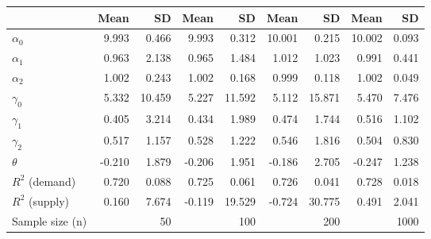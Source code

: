 
\begin{tabular}[t]{lrrrrrrrr}
\toprule
  & Mean & SD & Mean  & SD  & Mean   & SD   & Mean    & SD   \\
\midrule
$\alpha_{0}$ & 9.993 & 0.466 & 9.993 & 0.312 & 10.001 & 0.215 & 10.002 & 0.093\\
$\alpha_{1}$ & 0.963 & 2.138 & 0.965 & 1.484 & 1.012 & 1.023 & 0.991 & 0.441\\
$\alpha_{2}$ & 1.002 & 0.243 & 1.002 & 0.168 & 0.999 & 0.118 & 1.002 & 0.049\\
$\gamma_{0}$ & 5.332 & 10.459 & 5.227 & 11.592 & 5.112 & 15.871 & 5.470 & 7.476\\
$\gamma_{1}$ & 0.405 & 3.214 & 0.434 & 1.989 & 0.474 & 1.744 & 0.516 & 1.102\\
$\gamma_{2}$ & 0.517 & 1.157 & 0.528 & 1.222 & 0.546 & 1.816 & 0.504 & 0.830\\
$\theta$ & -0.210 & 1.879 & -0.206 & 1.951 & -0.186 & 2.705 & -0.247 & 1.238\\
$R^{2}$ (demand) & 0.720 & 0.088 & 0.725 & 0.061 & 0.726 & 0.041 & 0.728 & 0.018\\
$R^{2}$ (supply) & 0.160 & 7.674 & -0.119 & 19.529 & -0.724 & 30.775 & 0.491 & 2.041\\
Sample size (n) &  & 50 &  & 100 &  & 200 &  & 1000\\
\bottomrule
\end{tabular}
